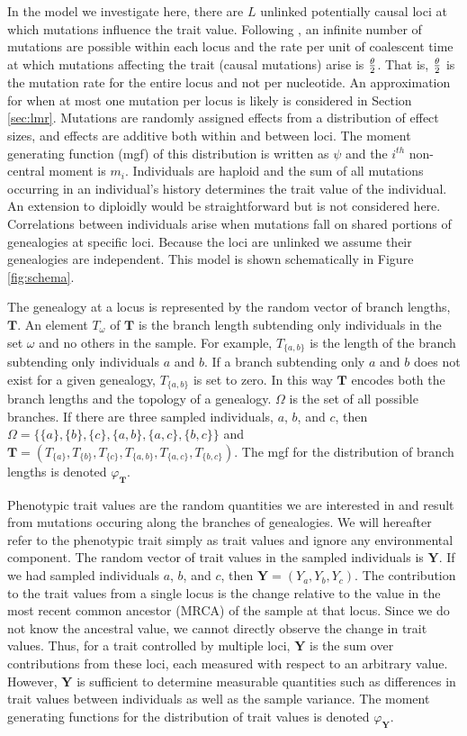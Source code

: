 In the model we investigate here, there are $L$ unlinked potentially causal loci
at which mutations influence the trait value. Following \citet{Kimura1969}, an
infinite number of mutations are possible within each locus and the rate per
unit of coalescent time at which mutations affecting the trait (causal
mutations) arise is $\frac{\theta}{2}$. That is, $\frac{\theta}{2}$ is the mutation rate for the entire
locus and not per nucleotide. An approximation for when at most one mutation per
locus is likely is considered in Section \ref{sec:lmr}. Mutations are randomly
assigned effects from a distribution of effect sizes, and effects are additive
both within and between loci. The moment generating function (mgf) of this
distribution is written as $\psi$ and the $i^{th}$ non-central moment is $m_i$.
Individuals are haploid and the sum of all mutations occurring in an
individual's history determines the trait value of the individual. An extension
to diploidly would be straightforward but is not considered here. Correlations
between individuals arise when mutations fall on shared portions of genealogies
at specific loci. Because the loci are unlinked we assume their genealogies are
independent. This model is shown schematically in Figure \ref{fig:schema}.

The genealogy at a locus is represented by the random vector of branch lengths,
$\mathbf{T}$. An element $T_{\omega}$ of $\mathbf{T}$ is the branch length
subtending only individuals in the set $\omega$ and no others in the sample. For
example, $T_{\{a,b\}}$ is the length of the branch subtending only individuals
$a$ and $b$. If a branch subtending only $a$ and $b$ does not exist for a given
genealogy, $T_{\{a,b\}}$ is set to zero. In this way $\mathbf{T}$ encodes both
the branch lengths and the topology of a genealogy. $\Omega$ is the set of all
possible branches. If there are three sampled individuals, $a$, $b$, and $c$,
then $\Omega=\{\{a\},\{b\},\{c\},\{a,b\},\{a,c\},\{b,c\}\}$ and
$\mathbf{T}=(T_{\{a\}},T_{\{b\}},T_{\{c\}},T_{\{a,b\}},T_{\{a,c\}},T_{\{b,c\}})$.
The mgf for the distribution of branch lengths is denoted $\varphi_{\mathbf{T}}$.

Phenotypic trait values are the random quantities we are interested in and
result from mutations occuring along the branches of genealogies. We will
hereafter refer to the phenotypic trait simply as trait values and ignore any
environmental component. The random vector of trait values in the sampled
individuals is $\mathbf{Y}$. If we had sampled individuals $a$, $b$, and $c$,
then $\mathbf{Y}=(Y_a,Y_b,Y_c)$. The contribution to the trait values from a
single locus is the change relative to the value in the most recent common
ancestor (MRCA) of the sample at that locus. Since we do not know the ancestral
value, we cannot directly observe the change in trait values. Thus, for a trait
controlled by multiple loci, $\mathbf{Y}$ is the sum over contributions from
these loci, each measured with respect to an arbitrary value. However,
$\mathbf{Y}$ is sufficient to determine measurable quantities such as
differences in trait values between individuals as well as the sample variance.
The moment generating functions for the distribution of trait values is denoted
$\varphi_{\mathbf{Y}}$.

